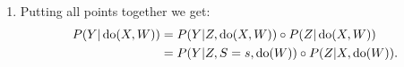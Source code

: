 {\begin{enumerate}
         \begin{align*}
             P(Y|Z,\doit(W)) & = P(Y|Z,S=s,\doit(W)).
         \end{align*}
     \item Putting all points together we get:
        \begin{align*}
            P(Y|\operatorname{do}(X,W)) &= P(Y|Z,\operatorname{do}(X,W)) \circ P(Z|\operatorname{do}(X,W)) \\
                            &= P(Y|Z,S=s,\operatorname{do}(W)) \circ P(Z|X,\operatorname{do}(W)).
        \end{align*}
\end{enumerate}
}
